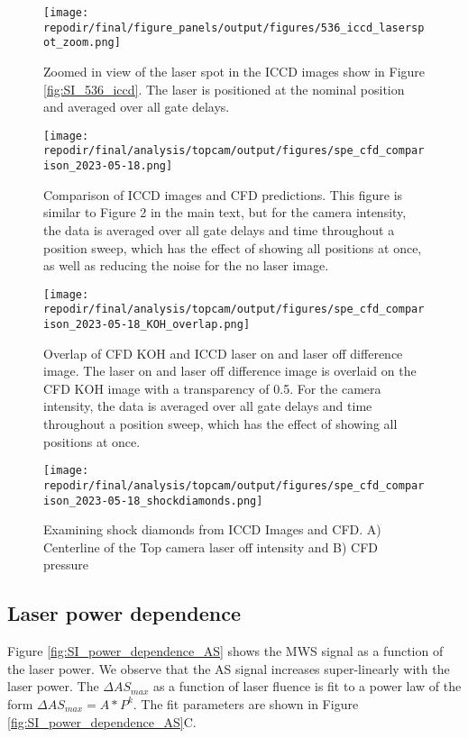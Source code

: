 \begin{figure}
    \centering
    \texttt{[image: \\repodir/final/figure\_panels/output/figures/536\_iccd\_laserspot\_zoom.png]} 
    \caption{Zoomed in view of the laser spot in the ICCD images show in Figure \ref{fig:SI_536_iccd}. The laser is positioned at the nominal position and averaged over all gate delays.}
    \label{fig:SI_536_iccd_laserspot_zoom}
\end{figure}


\begin{figure}[]
\centering
\texttt{[image: \\repodir/final/analysis/topcam/output/figures/spe\_cfd\_comparison\_2023-05-18.png]}
\caption{Comparison of ICCD images and CFD predictions. This figure is similar to Figure 2 in the main text, but for the camera intensity, the data is averaged over all gate delays and time throughout a position sweep, which has the effect of showing all positions at once, as well as reducing the noise for the no laser image.}
\label{fig:SI_iccd_cfd_comparison}
\end{figure}


\begin{figure}[]
\centering
\texttt{[image: \\repodir/final/analysis/topcam/output/figures/spe\_cfd\_comparison\_2023-05-18\_KOH\_overlap.png]}
\caption{Overlap of CFD KOH and ICCD laser on and laser off difference image. The laser on and laser off difference image is overlaid on the CFD KOH image with a transparency of 0.5. For the camera intensity, the data is averaged over all gate delays and time throughout a position sweep, which has the effect of showing all positions at once.}
\label{fig:SI_iccd_cfd_comparison_KOH_overlap}
\end{figure}

\begin{figure}
    \centering
    \texttt{[image: \\repodir/final/analysis/topcam/output/figures/spe\_cfd\_comparison\_2023-05-18\_shockdiamonds.png]} 
    \caption{Examining shock diamonds from ICCD Images and CFD. A) Centerline of the Top camera laser off intensity and B) CFD pressure}
    \label{fig:SI_iccd_cfd_comparison_KOH}
\end{figure}

\subsection{Laser power dependence}

Figure \ref{fig:SI_power_dependence_AS} shows the MWS signal as a function of the laser power. We observe that the AS signal increases super-linearly with the laser power. The $\Delta AS_{max}$ as a function of laser fluence is fit to a power law of the form $\Delta AS_{max} = A * P^k$. The fit parameters are shown in Figure \ref{fig:SI_power_dependence_AS}C.

